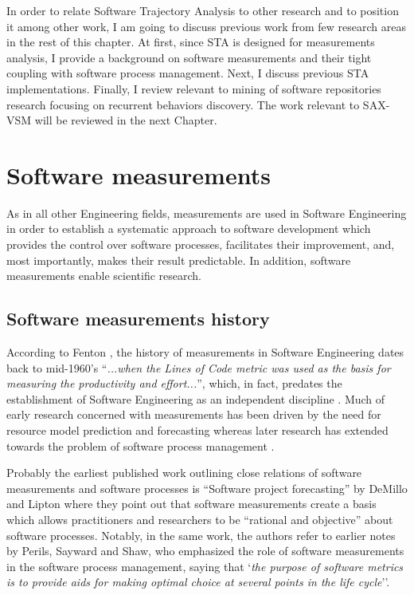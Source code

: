 In order to relate Software Trajectory Analysis to other research and to position it among other work, 
I am going to discuss previous work from few research areas in the rest of this chapter.
At first, since STA is designed for measurements analysis, I provide a background on software measurements 
and their tight coupling with software process management. 
Next, I discuss previous STA implementations. 
Finally, I review relevant to mining of software repositories research focusing on recurrent behaviors discovery.
The work relevant to SAX-VSM will be reviewed in the next Chapter.

\section{Software measurements}
As in all other Engineering fields, measurements are used in Software Engineering in order to establish a 
systematic approach to software development which provides the control over software processes, facilitates
their improvement, and, most importantly, makes their result predictable. 
In addition, software measurements enable scientific research.

\subsection{Software measurements history}
According to Fenton \cite{citeulike:1525462}, the history of measurements in Software Engineering dates 
back to mid-1960's  ``\textit{...when the Lines of Code metric was used as the basis for measuring the 
productivity and effort...}'', which, in fact, predates the establishment of Software Engineering as an 
independent discipline \cite{naur_crisis_68}. 
Much of early research concerned with measurements has been driven by the need for resource model prediction 
and forecasting \cite{citeulike:1525462} whereas later research has extended towards the problem of software 
process management \cite{citeulike:13158802}.

Probably the earliest published work outlining close relations of software measurements and software 
processes is ``Software project forecasting'' by DeMillo and Lipton \cite{demillo1980software} where they 
point out that software measurements create a basis which allows practitioners and researchers to be 
``rational and objective'' about software processes. 
Notably, in the same work, the authors refer to earlier notes by Perils, Sayward and Shaw, who emphasized 
the role of software measurements in the software process management, saying that `\textit{the purpose of 
software metrics is to provide aids for making optimal choice at several points in the life cycle}''.

